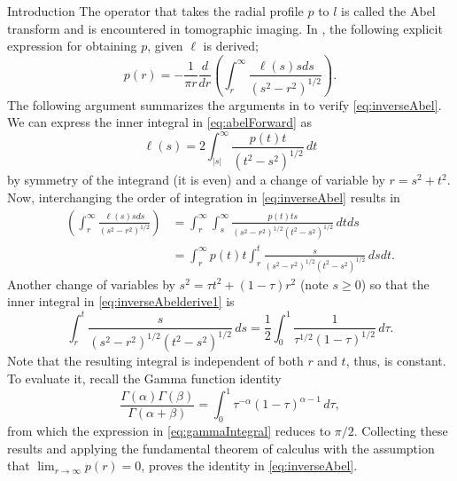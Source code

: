 \begin{chapter}{Introduction}
  The operator that takes the radial profile $p$ to $l$ is called the Abel transform and is encountered in tomographic imaging.
  In \citep{epstein2008}, the following explicit expression for obtaining $p$, given $\ell$ is derived;
  \begin{equation} \label{eq:inverseAbel}
    p(r) = -\frac{1}{\pi r} \frac{d}{dr}\left(\int_r^\infty \frac{\ell(s) s ds}{ (s^2 - r^2)^{1/2} } \right).  
  \end{equation} 
  The following argument summarizes the arguments in \citep{epstein2008} to verify \eqref{eq:inverseAbel}.
  We can express the inner integral in \eqref{eq:abelForward} as
  \begin{equation}
    \ell(s) = 2\int_{|s|}^\infty \frac{p(t) t}{(t^2 - s^2)^{1/2}}\,dt \label{eq:abelForward2}
  \end{equation}
  by symmetry of the integrand (it is even) and a change of variable by $r = s^2 + t^2$.
  Now, interchanging the order of integration in \eqref{eq:inverseAbel} results in
  \begin{align} 
    \left(\int_r^\infty \frac{\ell(s) s ds}{ (s^2 - r^2)^{1/2} } \right)  
    &= \int_r^\infty\int_s^\infty \frac{p(t) ts}{(s^2 - r^2)^{1/2}(t^2 - s^2)^{1/2}}\,dtds \nonumber\\
    &= \int_r^\infty p(t) t\int_r^t \frac{s}{(s^2 - r^2)^{1/2}(t^2 - s^2)^{1/2}}\,dsdt. \label{eq:inverseAbelderive1}
  \end{align} 
  Another change of variables by $s^2 = \tau t^2 + (1-\tau)r^2$ (note $s\ge0$)
  so that the inner integral in \eqref{eq:inverseAbelderive1} is
  \begin{equation}
    \int_r^t \frac{s}{(s^2 - r^2)^{1/2}(t^2 - s^2)^{1/2}}\,ds
    = \frac 12 \int_0^1 \frac {1}{\tau^{1/2}(1-\tau)^{1/2}}\,d\tau. \label{eq:gammaIntegral}
  \end{equation}
  Note that the resulting integral is independent of both $r$ and $t$, thus, is constant. To evaluate it, recall the Gamma function identity
  \begin{equation} 
    \frac{\Gamma(\alpha)\Gamma(\beta)}{\Gamma(\alpha + \beta)} = \int_0^1 \tau^{-\alpha}(1-\tau)^{\alpha -1}\,d\tau,
  \end{equation}
  from which the expression in \eqref{eq:gammaIntegral} reduces to $\pi/2$.
  Collecting these results and applying the fundamental theorem of calculus with the assumption that $\lim_{r\to\infty}p(r) = 0$, proves the identity in \eqref{eq:inverseAbel}.
  

\end{chapter}
